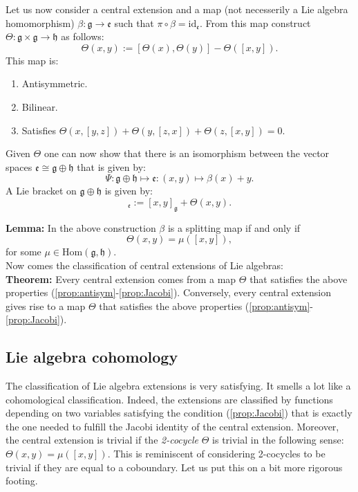 \documentclass[submission, PhysLectNotes]{SciPost}
\begin{document}
Let us now consider a central extension and a map (not necesserily a Lie algebra homomorphism) $\beta:\mathfrak{g}\rightarrow\mathfrak{e}$ such that $\pi\circ\beta = \text{id}_{\mathfrak{e}}$. From this map construct
$\Theta: \mathfrak{g}\times\mathfrak{g}\rightarrow\mathfrak{h}$ as follows:
\begin{equation}
	\Theta(x,y) := \left[\Theta(x),\Theta(y)\right] - \Theta\left([x,y]\right).
\end{equation}
This map is:
\begin{enumerate}
	\item \label{prop:antisym} Antisymmetric.
	\item \label{prop:bilinear} Bilinear.
	\item \label{prop:Jacobi} Satisfies $\Theta(x,[y,z]) + \Theta(y,[z,x]) + \Theta(z,[x,y]) = 0$. 
\end{enumerate}
Given $\Theta$ one can now show that there is an isomorphism between the vector spaces $\mathfrak{e}\cong\mathfrak{g}\oplus\mathfrak{h}$ that is given by:
\begin{equation}
	\Psi:\mathfrak{g}\oplus\mathfrak{h}\mapsto\mathfrak{e}:(x,y)\mapsto\beta(x) + y.
\end{equation}
A Lie bracket on $\mathfrak{g}\oplus\mathfrak{h}$ is given by:
\begin{equation}
	[x\oplus z, y\oplus z']_{\mathfrak{e}} := [x,y]_\mathfrak{g} + \Theta(x,y).
\end{equation}

{\bf Lemma:} In the above construction $\beta$ is a splitting map if and only if
\begin{equation}
	\Theta(x,y) = \mu([x,y]),
\end{equation}
for some $\mu\in\text{Hom}(\mathfrak{g},\mathfrak{h})$.\\

Now comes the classification of central extensions of Lie algebras:\\

{\bf Theorem:} Every central extension comes from a map $\Theta$ that satisfies the above properties (\ref{prop:antisym}-\ref{prop:Jacobi}). Conversely, every central extension gives rise to a map $\Theta$ that satisfies the above properties (\ref{prop:antisym}-\ref{prop:Jacobi}).

\subsection{Lie algebra cohomology}
The classification of Lie algebra extensions is very satisfying. It smells a lot like a cohomological classification. Indeed, the extensions are classified by functions depending on two variables satisfying the condition (\ref{prop:Jacobi}) that is exactly the one needed to fulfill the Jacobi identity of the central extension. Moreover, the central extension is trivial if the \emph{2-cocycle} $\Theta$ is trivial in the following sense: $\Theta(x,y) = \mu([x,y])$. This is reminiscent of considering 2-cocycles to be trivial if they are equal to a coboundary. Let us put this on a bit more rigorous footing.\\
\end{document}
